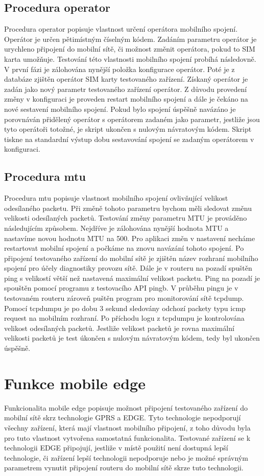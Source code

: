 \subsection{Procedura operator}
Procedura operator popisuje vlastnost určení operátora mobilního spojení. Operátor je určen pětimístným číselným kódem. Zadáním parametru operátor je urychleno připojení do mobilní sítě, či možnost změnit operátora, pokud to SIM karta umožňuje. Testování této vlastnosti mobilního spojení probíhá následovně. V první fázi je zálohována nynější položka konfigurace operátor. Poté je z databáze zjištěn operátor SIM karty testovaného zařízení. Získaný operátor je zadán jako nový parametr testovaného zařízení operátor. Z důvodu provedení změny v konfiguraci je proveden restart mobilního spojení a dále je čekáno na nové sestavení mobilního spojení. Pokud bylo spojení úspěšně navázáno je porovnáván přidělený operátor s operátorem zadaném jako parametr, jestliže jsou tyto operátoři totožné, je skript ukončen s nulovým návratovým kódem. Skript tiskne na standardní výstup dobu sestavování spojení se zadaným operátorem v konfiguraci.

\subsection{Procedura mtu}
Procedura mtu popisuje vlastnost mobilního spojení ovlivňující velikost odesílaného packetu. Při změně tohoto parametru bychom měli sledovat změnu velikosti odesílaných packetů. Testování změny parametru MTU je prováděno následujícím způsobem. Nejdříve je zálohována nynější hodnota MTU a nastavíme novou hodnotu MTU na 500. Pro aplikaci změn v nastavení necháme restartovat mobilní spojení a počkáme na znovu navázání tohoto spojení. Po připojení testovaného zařízení do mobilní sítě je zjištěn název rozhraní mobilního spojení pro účely diagnostiky provozu sítě. Dále je v routeru na pozadí spuštěn ping s velikostí větší než nastavená maximální velikost packetu. Ping na pozadí je spouštěn pomocí programu z testovacího API pingb. V průběhu pingu je v testovaném routeru zároveň puštěn program pro monitorování sítě tcpdump. Pomocí tcpdumpu je po dobu 3 sekund sledovány odchozí packety typu icmp request na mobilním rozhraní. Po příchodu logu z tcpdumpu je kontrolována velikost odesílaných packetů. Jestliže velikost packetů je rovna maximální velikosti packetů je test úkončen s nulovým návratovým kódem, tedy byl ukončen úspěšně.

\section{Funkce mobile edge}
Funkcionalita mobile edge popisuje možnost připojení testovaného zařízení do mobilní sítě skrz technologie GPRS a EDGE. Tyto technologie nepodporují všechny zařízení, která mají vlastnost mobilního připojení, z toho důvodu byla pro tuto vlastnost vytvořena samostatná funkcionalita. Testované zařízení se k technologii EDGE  připojují, jestliže v místě použití není dostupná lepší technologie, či zařízení lepší technologii nepodporuje nebo je možné správným parametrem vynutit připojení routeru do mobilní sítě skrze tuto technologii.

